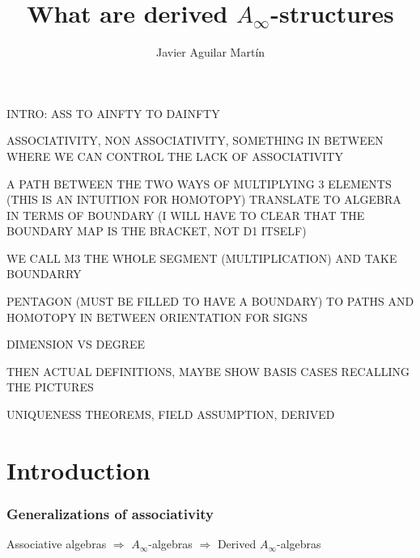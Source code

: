 \documentclass{beamer}
\title{What are derived $A_\infty$-structures}
\author{Javier Aguilar Mart\'in}
\institute{University of Kent}
\date{}
\theoremstyle{definition}
\begin{document}
\frame{\titlepage}
%
% 
% 
% 

% 



\newcommand{\seti}{\setcounter{saveenumi}{\value{enumi}}}
\newcommand{\conti}{\setcounter{enumi}{\value{saveenumi}}}

\makeatletter
\makeatother


\begin{frame}
INTRO: ASS TO AINFTY TO DAINFTY

ASSOCIATIVITY, NON ASSOCIATIVITY, SOMETHING IN BETWEEN WHERE WE CAN CONTROL THE LACK OF ASSOCIATIVITY

A PATH BETWEEN THE TWO WAYS OF MULTIPLYING 3 ELEMENTS (THIS IS AN  INTUITION FOR HOMOTOPY) TRANSLATE TO ALGEBRA IN TERMS OF BOUNDARY (I WILL HAVE TO CLEAR THAT THE BOUNDARY MAP IS THE BRACKET, NOT D1 ITSELF)

WE CALL M3 THE WHOLE SEGMENT (MULTIPLICATION) AND TAKE BOUNDARRY

PENTAGON (MUST BE FILLED TO HAVE A BOUNDARY) TO PATHS AND HOMOTOPY IN BETWEEN ORIENTATION FOR SIGNS

DIMENSION VS DEGREE

THEN ACTUAL DEFINITIONS, MAYBE SHOW BASIS CASES RECALLING THE PICTURES

UNIQUENESS THEOREMS, FIELD ASSUMPTION, DERIVED
\end{frame}
\section{Introduction}
\begin{frame}
\frametitle{Generalizations of associativity}

Associative algebras $\Rightarrow$ $A_\infty$-algebras $\Rightarrow$ Derived $A_\infty$-algebras
\end{frame}
\end{document}
